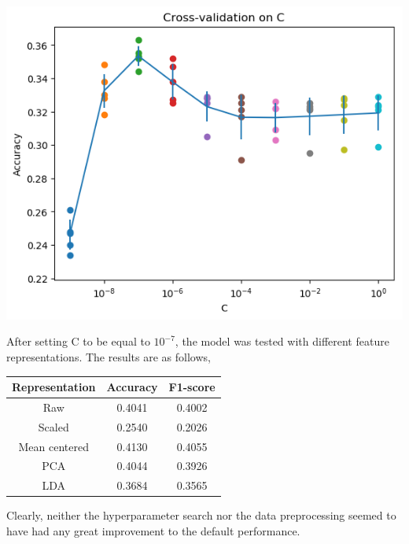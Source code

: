 \documentclass[12pt]{article}
\begin{document}
\begin{center}
\includegraphics[scale=0.6]{lreg-c.png}
\end{center}

After setting C to be equal to $10^{-7}$, the model was tested with different feature representations. The results are as follows,

\begin{center}
  \begin{tabular}{|c|c|c|}
    \hline
    Representation & Accuracy & F1-score \\
    \hline
    Raw & 0.4041 & 0.4002\\
    Scaled & 0.2540 & 0.2026 \\
    Mean centered & 0.4130 & 0.4055\\
    PCA & 0.4044 & 0.3926\\
    LDA & 0.3684 & 0.3565 \\
    \hline
  \end{tabular}
\end{center}

Clearly, neither the hyperparameter search nor the data preprocessing seemed to have had any great improvement to the default performance.
\end{document}
